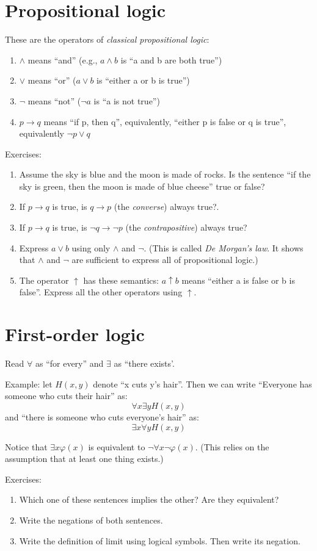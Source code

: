 \documentclass[letterpaper,12pt]{article}
\renewcommand{\implies}{\rightarrow}
\renewcommand{\phi}{\varphi}
\begin{document}
\section{Propositional logic}
These are the operators of \emph{classical propositional logic}:
\begin{enumerate}
\item
$\land$ means ``and'' (e.g., $a \land b$ is ``a and b are both true'')
\item
$\lor$ means ``or'' ($a \lor b$ is ``either a or b is true'')
\item
$\neg$ means ``not'' ($\neg a$ is ``a is not true'')
\item
$p \implies q$ means ``if p, then q'', equivalently, ``either p is false or q is true'', equivalently $\neg p \lor q$
\end{enumerate}

Exercises:
\begin{enumerate}
\item
Assume the sky is blue and the moon is made of rocks. Is the sentence ``if the sky is green, then the moon is made of blue cheese'' true or false?
\item
If $p \implies q$ is true, is $q \implies p$ (the \emph{converse}) always true?.
\item
If $p \implies q$ is true, is $\neg q \implies \neg p$ (the \emph{contrapositive}) always true?
\item
Express $a \lor b$ using only $\land$ and $\neg$. (This is called \emph{De Morgan's law}. It shows that $\land$ and $\neg$ are sufficient to express all of propositional logic.)
\item
The operator $\uparrow$ has these semantics: $a \uparrow b$ means ``either a is false or b is false''. Express all the other operators using $\uparrow$.
\end{enumerate}

\section{First-order logic}
Read $\forall$ as ``for every'' and $\exists$ as ``there exists'.

Example: let $H(x, y)$ denote ``x cuts y's hair''. Then we can write ``Everyone has someone who cuts their hair'' as:
$$\forall x \exists y H(x, y)$$
and ``there is someone who cuts everyone's hair'' as:
$$\exists x \forall y H(x, y)$$

Notice that $\exists x \phi(x)$ is equivalent to $\neg \forall x \neg \phi(x)$. (This relies on the assumption that at least one thing exists.)

Exercises:
\begin{enumerate}
\item
Which one of these sentences implies the other? Are they equivalent?
\item
Write the negations of both sentences.
\item
Write the definition of limit using logical symbols. Then write its negation.
\end{enumerate}
\end{document}

